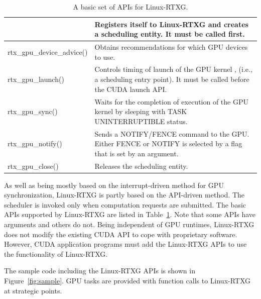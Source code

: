 \begin{table}[!t]
\begin{center}
\caption{A basic set of APIs for Linux-RTXG.}
\label{tab:rtx-api}
\ifthesis
\begin{tabular}{|l|p{25em}|} \hline
\else
\begin{tabular}{|l|p{50em}|} \hline
\fi
rtx\_gpu\_open() & Registers itself to Linux-RTXG and creates a scheduling entity. It must be called first. \\ \hline
rtx\_gpu\_device\_advice() & Obtains recommendations for which GPU devices to use. \\ \hline
rtx\_gpu\_launch() & Controls timing of launch of the GPU kernel , (i.e., a scheduling entry point). It must be called before the CUDA launch API. \\ \hline
rtx\_gpu\_sync() & Waits for the completion of execution of the GPU kernel by sleeping with TASK UNINTERRUPTIBLE status. \\ \hline
rtx\_gpu\_notify() & Sends a NOTIFY/FENCE command to the GPU. Either FENCE or NOTIFY is selected by a flag that is set by an argument.\\ \hline
rtx\_gpu\_close() & Releases the scheduling entity.\\ \hline
\end{tabular}
\end{center}
\end{table}

As well as being mostly based on the interrupt-driven method for GPU synchronization, Linux-RTXG is partly based on the API-driven method.
The scheduler is invoked only when computation requests are submitted.
The basic APIs supported by Linux-RTXG are listed in Table~\ref{tab:rtx-api}.
Note that some APIs have arguments and others do not.
Being independent of GPU runtimes, Linux-RTXG does not modify the existing CUDA API to cope with proprietary software.
However, CUDA application programs must add the Linux-RTXG APIs to use the functionality of Linux-RTXG.


The sample code including the Linux-RTXG APIs is shown in Figure~\ref{fig:sample}.
GPU tasks are provided with function calls to Linux-RTXG at strategic points.

